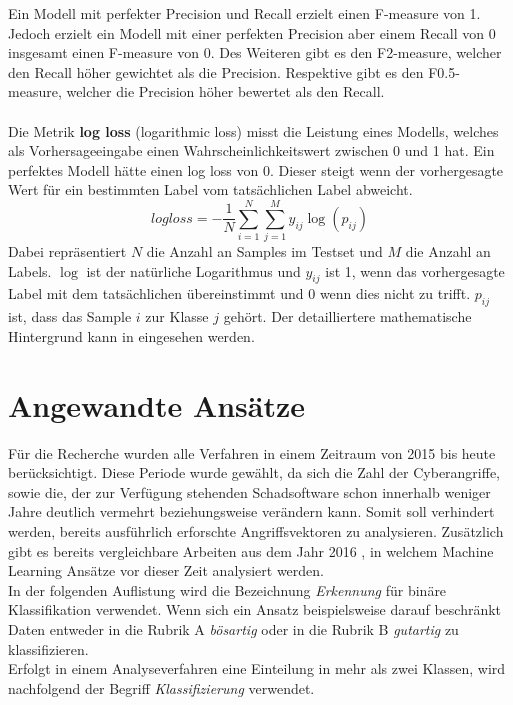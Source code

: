 \documentclass[
    12pt, %
    DIV10,
    ngerman, %
    a4paper, %
    oneside, %
    titlepage, %
    parskip=half, %
    headings=normal, %
    listof=totoc, %
    bibliography=totoc, %
    index=totoc, %
    captions=tableheading, %
    final %
]{scrreprt}
\begin{document}
Ein Modell mit perfekter Precision und Recall erzielt einen F-measure von 1. Jedoch erzielt ein Modell mit einer perfekten Precision aber einem Recall von 0 insgesamt einen F-measure von 0. Des Weiteren gibt es den F2-measure, welcher den Recall höher gewichtet als die Precision. Respektive gibt es den F0.5-measure, welcher die Precision höher bewertet als den Recall.
\\\\
Die Metrik \textbf{log loss} (logarithmic loss) misst die Leistung eines Modells, welches als Vorhersageeingabe einen Wahrscheinlichkeitswert zwischen 0 und 1 hat. Ein perfektes Modell hätte einen log loss von 0. Dieser steigt wenn der vorhergesagte Wert für ein bestimmten Label vom tatsächlichen Label abweicht.
$$log loss = -\frac{1}{N}\displaystyle\sum_{i=1}^{N}\displaystyle\sum_{j=1}^{M} y_{ij}\log(p_{ij})$$
Dabei repräsentiert $N$ die Anzahl an Samples im Testset und $M$ die Anzahl an Labels. $\log$ ist der natürliche Logarithmus und $y_{ij}$ ist 1, wenn das vorhergesagte Label mit dem tatsächlichen übereinstimmt und 0 wenn dies nicht zu trifft. $p_{ij}$ ist, dass das Sample $i$ zur Klasse $j$ gehört. Der detailliertere mathematische Hintergrund kann in \textcite{Nielsen} eingesehen werden.
\section{Angewandte Ansätze}
Für die Recherche wurden alle Verfahren in einem Zeitraum von 2015 bis heute berücksichtigt. Diese Periode wurde gewählt, da sich die Zahl der Cyberangriffe, sowie die, der zur Verfügung stehenden Schadsoftware schon innerhalb weniger Jahre deutlich vermehrt beziehungsweise verändern kann. Somit soll verhindert werden, bereits ausführlich erforschte Angriffsvektoren zu analysieren. Zusätzlich gibt es bereits vergleichbare Arbeiten aus dem Jahr 2016 \parencite[s.][]{Buczak2016}, in welchem Machine Learning Ansätze vor dieser Zeit analysiert werden.\\
In der folgenden Auflistung wird die Bezeichnung \emph{Erkennung} für binäre Klassifikation verwendet. Wenn sich ein Ansatz beispielsweise darauf beschränkt Daten entweder in die Rubrik A \emph{bösartig} oder in die Rubrik B \emph{gutartig} zu klassifizieren.\\
Erfolgt in einem Analyseverfahren eine Einteilung in mehr als zwei Klassen, wird nachfolgend der Begriff 
\emph{Klassifizierung} verwendet.
\end{document}
